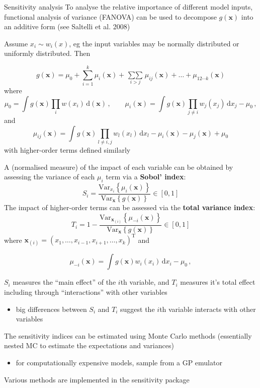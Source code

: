 \documentclass[
  ignorenonframetext,
]{beamer}
\providecommand{\tightlist}{%
  \setlength{\itemsep}{0pt}\setlength{\parskip}{0pt}}
\begin{document}
\begin{frame}{Sensitivity analysis}
\protect\hypertarget{sensitivity-analysis}{}
To analyse the relative importance of different model inputs, functional
analysis of variance (FANOVA) can be used to decompose
\(g(\boldsymbol{x})\) into an additive form (see Saltelli et al. 2008)

Assume \(x_i\sim w_i(x)\), eg the input variables may be normally
distributed or uniformly distributed. Then

\[
g(\boldsymbol{x}) = \mu_0 + \sum_{i=1}^k\mu_i(\boldsymbol{x}) + \mathop{\sum\sum}\limits_{i>j}\mu_{ij}(\boldsymbol{x}) + \ldots + \mu_{12\cdots k}(\boldsymbol{x})
\] where \[
\mu_0 = \int g(\boldsymbol{x})\prod_iw(x_i)\,\mathrm{d}(\boldsymbol{x})\,,\qquad \mu_i(\boldsymbol{x}) = \int g(\boldsymbol{x})\prod_{j\ne i}w_j(x_j)\,\mathrm{d}x_j - \mu_0\,,
\] and \[
\mu_{ij}(\boldsymbol{x}) = \int g(\boldsymbol{x})\prod_{l \ne i,j}w_l(x_l)\,\mathrm{d}x_l - \mu_i(\boldsymbol{x}) - \mu_j(\boldsymbol{x}) + \mu_0
\] with higher-order terms defined similarly
\end{frame}

\begin{frame}{}
\protect\hypertarget{section-59}{}
A (normalised measure) of the impact of each variable can be obtained by
assessing the variance of each \(\mu_i\) term via a \textbf{Sobol'
index}: \[
S_i = \frac{\mbox{Var}_{x_i}\left\{\mu_i(\boldsymbol{x})\right\}}{\mbox{Var}_\boldsymbol{x}\left\{g(\boldsymbol{x})\right\}} \in [0,1]
\] The impact of higher-order terms can be assessed via the
\textbf{total variance index}: \[
T_i = 1 - \frac{\mbox{Var}_{\boldsymbol{x}_{(i)}}\left\{\mu_{-i}(\boldsymbol{x})\right\}}{\mbox{Var}_{\boldsymbol{x}}\left\{g(\boldsymbol{x})\right\}} \in [0,1]
\] where
\(\boldsymbol{x}_{(i)} = (x_1,\ldots,x_{i-1},x_{i+1},\ldots,x_k)^\mathrm{T}\)
and

\[
\mu_{-i}(\boldsymbol{x}) = \int g(\boldsymbol{x})w_i(x_i)\,\mathrm{d}x_i - \mu_0\,,
\]
\end{frame}

\begin{frame}{}
\protect\hypertarget{section-60}{}
\(S_i\) measures the ``main effect'' of the \(i\)th variable, and
\(T_i\) measures it's total effect including through ``interactions''
with other variables

\begin{itemize}
\tightlist
\item
  big differences between \(S_i\) and \(T_i\) suggest the \(i\)th
  variable interacts with other variables
\end{itemize}

The sensitivity indices can be estimated using Monte Carlo methods
(essentially nested MC to estimate the expectations and variances)

\begin{itemize}
\tightlist
\item
  for computationally expensive models, sample from a GP emulator
\end{itemize}

Various methods are implemented in the sensitivity package
\end{frame}
\end{document}
